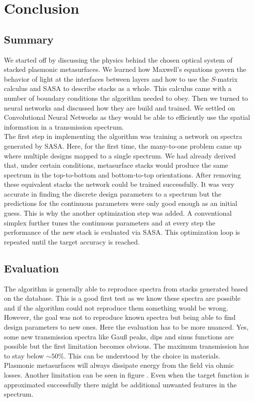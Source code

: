 \section{Conclusion} \label{sec:conclusion}

\subsection{Summary}
We started off by discussing the physics behind the chosen optical system of stacked plasmonic metasurfaces. 
We learned how Maxwell's equations govern the behavior of light at the interfaces between layers and how to use the $S$-matrix calculus and SASA to describe stacks as a whole. This calculus came with a number of boundary conditions the algorithm needed to obey. Then we turned to neural networks and discussed how they are build and trained. We settled on Convolutional Neural Networks as they would be able to efficiently use the spatial information in a transmission spectrum.
\\

\indent
The first step in implementing the algorithm was training a network on spectra generated by SASA. Here, for the first time, the many-to-one problem came up where multiple designs mapped to a single spectrum. We had already derived that, under certain conditions, metasurface stacks would produce the same spectrum in the top-to-bottom and bottom-to-top orientations. After removing these equivalent stacks the network could be trained successfully. It was very accurate in finding the discrete design parameters to a spectrum but the predictions for the continuous parameters were only good enough as an initial guess.
This is why the another optimization step was added. A conventional simplex further tunes the continuous parameters and at every step the performance of the new stack is evaluated via SASA. This optimization loop is repeated until the target accuracy is reached.


\subsection{Evaluation}
The algorithm is generally able to reproduce spectra from stacks generated based on the database. This is a good first test as we know these spectra are possible and if the algorithm could not reproduce them something would be wrong. However, the goal was not to reproduce known spectra but being able to find design parameters to new ones. Here the evaluation has to be more nuanced. Yes, some new transmission spectra like Gauß peaks, dips and sinus functions are possible but the first limitation becomes obvious. The maximum transmission has to stay below $\sim 50\%$. This can be understood by the choice in materials. Plasmonic metasurfaces will always dissipate energy from the field via ohmic losses. Another limitation can be seen in figure . Even when the target function is approximated successfully there might be additional unwanted features in the spectrum. 
\\

